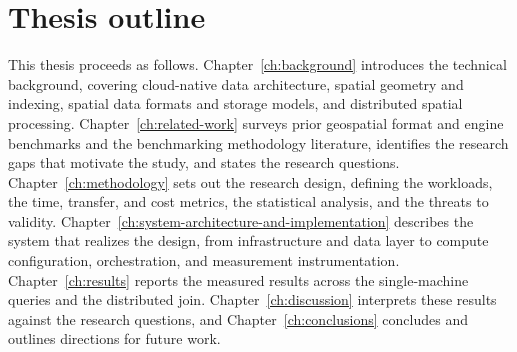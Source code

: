 \section{Thesis outline}
\label{introduction:thesis-outline}
This thesis proceeds as follows. Chapter~\ref{ch:background} introduces the technical background, covering cloud-native data architecture, spatial geometry and indexing, spatial data formats and storage models, and distributed spatial processing. Chapter~\ref{ch:related-work} surveys prior geospatial format and engine benchmarks and the benchmarking methodology literature, identifies the research gaps that motivate the study, and states the research questions. Chapter~\ref{ch:methodology} sets out the research design, defining the workloads, the time, transfer, and cost metrics, the statistical analysis, and the threats to validity. Chapter~\ref{ch:system-architecture-and-implementation} describes the system that realizes the design, from infrastructure and data layer to compute configuration, orchestration, and measurement instrumentation. Chapter~\ref{ch:results} reports the measured results across the single-machine queries and the distributed join. Chapter~\ref{ch:discussion} interprets these results against the research questions, and Chapter~\ref{ch:conclusions} concludes and outlines directions for future work.